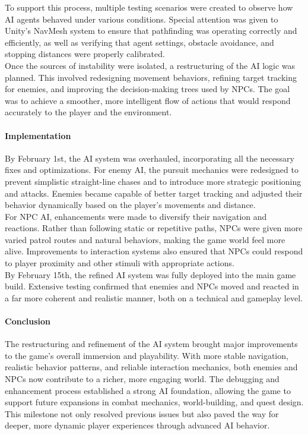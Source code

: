\documentclass{article}
\begin{document}
To support this process, multiple testing scenarios were created to observe how AI agents behaved under various conditions. Special attention was given to Unity's NavMesh system to ensure that pathfinding was operating correctly and efficiently, as well as verifying that agent settings, obstacle avoidance, and stopping distances were properly calibrated.\\

Once the sources of instability were isolated, a restructuring of the AI logic was planned. This involved redesigning movement behaviors, refining target tracking for enemies, and improving the decision-making trees used by NPCs. The goal was to achieve a smoother, more intelligent flow of actions that would respond accurately to the player and the environment.

\paragraph{Implementation}\hfill

By February 1st, the AI system was overhauled, incorporating all the necessary fixes and optimizations. For enemy AI, the pursuit mechanics were redesigned to prevent simplistic straight-line chases and to introduce more strategic positioning and attacks. Enemies became capable of better target tracking and adjusted their behavior dynamically based on the player's movements and distance.\\

For NPC AI, enhancements were made to diversify their navigation and reactions. Rather than following static or repetitive paths, NPCs were given more varied patrol routes and natural behaviors, making the game world feel more alive. Improvements to interaction systems also ensured that NPCs could respond to player proximity and other stimuli with appropriate actions.\\

By February 15th, the refined AI system was fully deployed into the main game build. Extensive testing confirmed that enemies and NPCs moved and reacted in a far more coherent and realistic manner, both on a technical and gameplay level.

\paragraph{Conclusion}\hfill

The restructuring and refinement of the AI system brought major improvements to the game's overall immersion and playability. With more stable navigation, realistic behavior patterns, and reliable interaction mechanics, both enemies and NPCs now contribute to a richer, more engaging world. The debugging and enhancement process established a strong AI foundation, allowing the game to support future expansions in combat mechanics, world-building, and quest design. This milestone not only resolved previous issues but also paved the way for deeper, more dynamic player experiences through advanced AI behavior.
\end{document}
